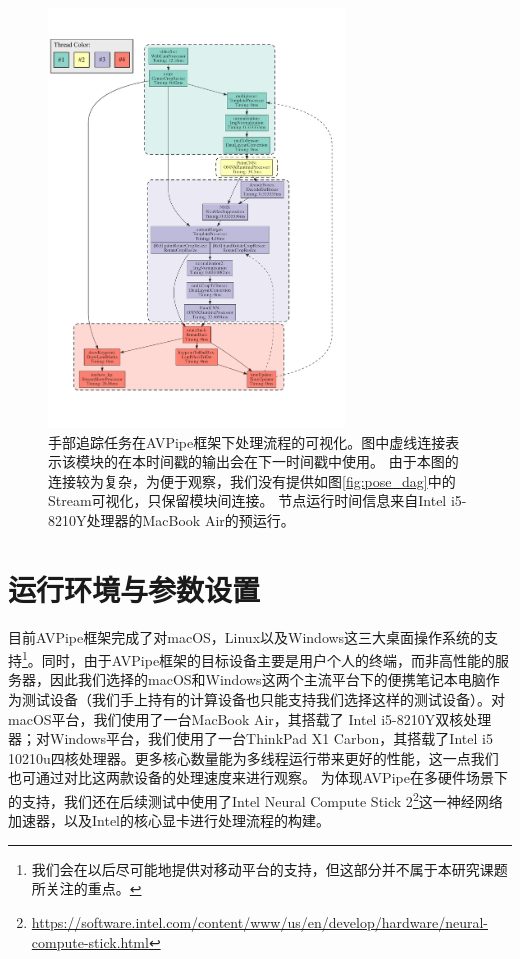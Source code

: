 \begin{figure}[!bt]
    \centering
    \includegraphics[width=0.7\textwidth]{figure/AVP_multi_hand_tracking.pdf}
    \caption[手部追踪任务在AVPipe框架下处理流程的可视化]{手部追踪任务在AVPipe框架下处理流程的可视化。图中虚线连接表示该模块的在本时间戳的输出会在下一时间戳中使用。 由于本图的连接较为复杂，为便于观察，我们没有提供如图\ref{fig:pose_dag}中的Stream可视化，只保留模块间连接。
    节点运行时间信息来自Intel i5-8210Y处理器的MacBook Air的预运行。}
    \label{fig:hand_dag}
\end{figure}

\section{运行环境与参数设置}
目前AVPipe框架完成了对macOS，Linux以及Windows这三大桌面操作系统的支持\footnote{我们会在以后尽可能地提供对移动平台的支持，但这部分并不属于本研究课题所关注的重点。}。同时，由于AVPipe框架的目标设备主要是用户个人的终端，而非高性能的服务器，因此我们选择的macOS和Windows这两个主流平台下的便携笔记本电脑作为测试设备（我们手上持有的计算设备也只能支持我们选择这样的测试设备）。对macOS平台，我们使用了一台MacBook Air，其搭载了
Intel i5-8210Y双核处理器；对Windows平台，我们使用了一台ThinkPad X1 Carbon，其搭载了Intel i5 10210u四核处理器。更多核心数量能为多线程运行带来更好的性能，这一点我们也可通过对比这两款设备的处理速度来进行观察。
为体现AVPipe在多硬件场景下的支持，我们还在后续测试中使用了Intel Neural Compute Stick 2\footnote{\url{https://software.intel.com/content/www/us/en/develop/hardware/neural-compute-stick.html}}这一神经网络加速器，以及Intel的核心显卡进行处理流程的构建。\par

